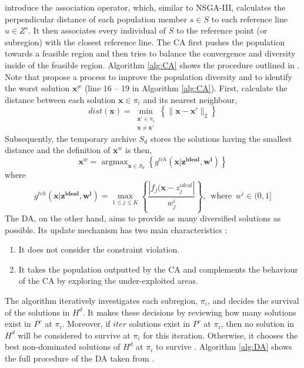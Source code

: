 \documentclass[mscthesis, 11pt]{usiinfthesis}
\DeclareMathOperator*{\argmax}{argmax}
\theoremstyle{newdefinition}
\begin{document}
\cite{li_two-archive_2019} introduce the association operator, which, similar to NSGA-III, calculates the perpendicular distance of each population member $s \in S$ to each reference line $u \in Z^s$. It then associates every individual of $S$ to the reference point (or subregion) with the closest reference line. The CA first pushes the population towards a feasible region and then tries to balance the convergence and diversity inside of the feasible region. Algorithm \ref{alg:CA} shows the procedure outlined in \cite[~pp.~306-307]{li_two-archive_2019}. Note that \cite{li_two-archive_2019} propose a process to improve the population diversity and to identify the worst solution $\mathbf{x}^w$ (line $16$ -- $19$ in Algorithm \ref{alg:CA}). First, calculate the distance between each solution $\mathbf{x} \in \pi_i$ and its nearest neighbour,
\begin{equation}
    dist(\mathbf{x}) = \min_{\substack{\mathbf{x'} \in \pi_i \\ \mathbf{x} \neq \mathbf{x'}}} \left\{\lVert \mathbf{x} - \mathbf{x'} \rVert_2 \right\}
\end{equation}
Subsequently, the temporary archive $S_d$ stores the solutions having the smallest distance and the definition of $\mathbf{x}^w$ is then,
\begin{equation}
    \mathbf{x}^w = \argmax_{\mathbf{x} \in S_d} \left \{ g^{tch}(\mathbf{x} | \mathbf{z^{ideal}, w^i}) \right \}
\end{equation}
where
\begin{equation}
    g^{tch}(\mathbf{x} | \mathbf{z^{ideal}, w^i}) = \max_{1 \leq j \leq K} \left \{ \frac{|f_j (\mathbf{x} - z^{ideal}_j|}{w^i_j} \right \}, \enspace \text{where} \enspace w^i \in (0, 1]
\end{equation}
The DA, on the other hand, aims to provide as many diversified solutions as possible. Its update mechanism has two main characteristics \cite[~p.~307]{li_two-archive_2019}:
\begin{enumerate}
    \item It does not consider the constraint violation.
    \item It takes the population outputted by the CA and complements the behaviour of the CA by exploring the under-exploited areas.
\end{enumerate}
The algorithm iteratively investigates each subregion, $\pi_i$, and decides the survival of the solutions in $H^d$. It makes these decisions by reviewing how many solutions exist in $P^c$ at $\pi_i$. Moreover, if $iter$ solutions exist in $P^c$ at $\pi_i$, then no solution in $H^d$ will be considered to survive at $\pi_i$ for this iteration. Otherwise, it chooses the best non-dominated solutions of $H^d$ at $\pi_i$ to survive \cite[~p.~307]{li_two-archive_2019}. Algorithm \ref{alg:DA} shows the full procedure of the DA taken from \cite[~p.~308]{li_two-archive_2019}.
\end{document}
